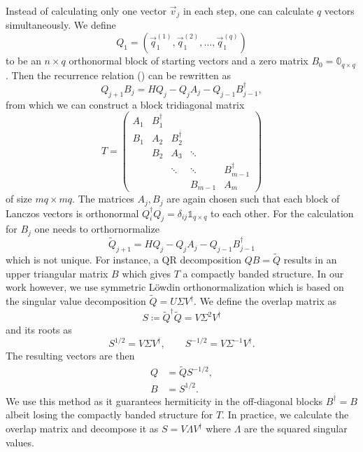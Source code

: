 Instead of calculating only one vector $\vec{v}_j$ in each step,
one can calculate $q$ vectors simultaneously.
We define
\begin{equation}
    Q_1 = (\vec{q}_1^{(1)}, \vec{q}_1^{(2)}, \ldots, \vec{q}_1^{(q)})
\end{equation}
to be an
$n\times q$ orthonormal block of starting vectors
and a zero matrix $B_0 = \mathbb{0}_{q\times q}$.
Then the recurrence relation () can be rewritten as
\begin{equation}
    Q_{j+1} B_j = H Q_j - Q_j A_j - Q_{j-1} B_{j-1}^\dag,
    \label{eq:block-Lanczos-recurrence}
\end{equation}
from which we can construct a block tridiagonal matrix
\begin{equation}
    T
    =
    \begin{pmatrix}
        A_1 & B_1^\dag &          &         &              \\
        B_1 & A_2      & B_2^\dag &         &              \\
            & B_2      & A_3      & \ddots  &              \\
            &          & \ddots   & \ddots  & B_{m-1}^\dag \\
            &          &          & B_{m-1} & A_m
    \end{pmatrix}
\end{equation}
of size $mq\times mq$.
The matrices $A_j, B_j$ are again chosen such that each block of Lanczos vectors is orthonormal
$Q_i^\dag Q_j = \delta_{ij}\mathbb{1}_{q\times q}$ to each other.
For the calculation for $B_j$ one needs to orthornormalize
\begin{equation}
    \tilde Q_{j+1} = H Q_j - Q_j A_j - Q_{j-1} B_{j-1}^\dag
\end{equation}
which is not unique.
For instance, a QR decomposition \cite{Cullum1985, Grimes1994} $Q B = \tilde{Q}$
results in an upper triangular matrix $B$ which gives $T$ a compactly banded structure.
In our work however, we use symmetric Löwdin orthonormalization \cite{Lowdin1950, Brass2021}
which is based on the singular value decomposition $\tilde Q = U \Sigma V^\dag$.
We define the overlap matrix as
\begin{equation}
    S \coloneqq \tilde Q^\dag \tilde Q = V \Sigma^{2} V^\dagger
\end{equation}
and its roots as
\begin{equation}
    S^{1/2}  = V \Sigma V^\dagger, \qquad S^{-1/2} = V \Sigma^{-1} V^\dagger.
\end{equation}
The resulting vectors are then
\begin{align}
    Q & = \tilde Q S^{-1/2}, \\
    B & = S^{1/2}.
\end{align}
We use this method as it guarantees hermiticity in the off-diagonal blocks $B^\dag = B$
albeit losing the compactly banded structure for $T$.
In practice, we calculate the overlap matrix and decompose it as $S = V \Lambda V^\dag$
where $\Lambda$ are the squared singular values.

